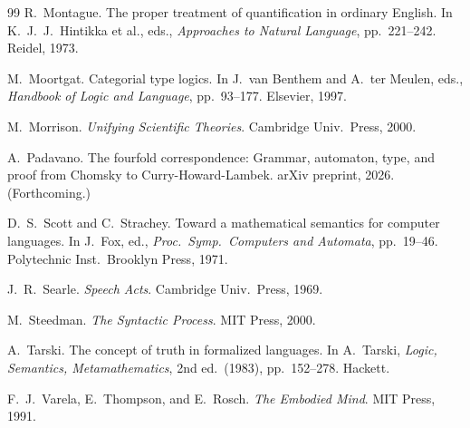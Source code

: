 \documentclass[12pt,a4paper]{article}
\begin{document}
\begin{thebibliography}{99}
R.~Montague.
\newblock The proper treatment of quantification in ordinary English.
\newblock In K.~J.~J.~Hintikka et al., eds., \emph{Approaches to Natural Language}, pp.~221--242. Reidel, 1973.

M.~Moortgat.
\newblock Categorial type logics.
\newblock In J.~van Benthem and A.~ter Meulen, eds., \emph{Handbook of Logic and Language}, pp.~93--177. Elsevier, 1997.

M.~Morrison.
\newblock \emph{Unifying Scientific Theories}.
\newblock Cambridge Univ.\ Press, 2000.

A.~Padavano.
\newblock The fourfold correspondence: Grammar, automaton, type, and proof from Chomsky to Curry-Howard-Lambek.
\newblock arXiv preprint, 2026. (Forthcoming.)

D.~S.~Scott and C.~Strachey.
\newblock Toward a mathematical semantics for computer languages.
\newblock In J.~Fox, ed., \emph{Proc.\ Symp.\ Computers and Automata}, pp.~19--46. Polytechnic Inst.\ Brooklyn Press, 1971.

J.~R.~Searle.
\newblock \emph{Speech Acts}.
\newblock Cambridge Univ.\ Press, 1969.

M.~Steedman.
\newblock \emph{The Syntactic Process}.
\newblock MIT Press, 2000.

A.~Tarski.
\newblock The concept of truth in formalized languages.
\newblock In A.~Tarski, \emph{Logic, Semantics, Metamathematics}, 2nd ed.\ (1983), pp.~152--278. Hackett.

F.~J.~Varela, E.~Thompson, and E.~Rosch.
\newblock \emph{The Embodied Mind}.
\newblock MIT Press, 1991.

\end{thebibliography}
\end{document}
